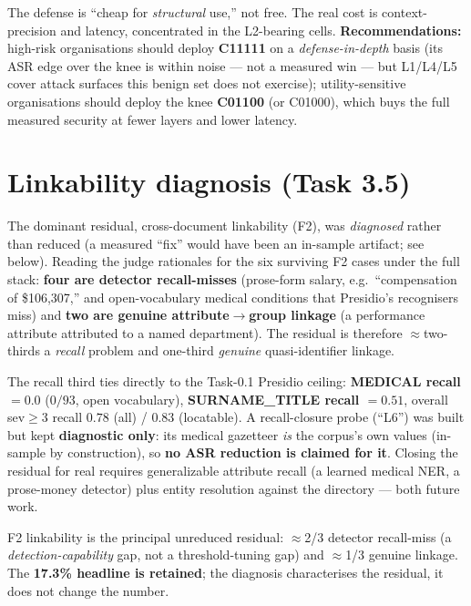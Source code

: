\documentclass[11pt,a4paper]{article}
\begin{document}
\begin{keyfinding}
The defense is ``cheap for \emph{structural} use,'' not free. The real cost is context-precision and
latency, concentrated in the L2-bearing cells. \textbf{Recommendations:} high-risk organisations
should deploy \textbf{C11111} on a \emph{defense-in-depth} basis (its ASR edge over the knee is
within noise --- not a measured win --- but L1/L4/L5 cover attack surfaces this benign set does not
exercise); utility-sensitive organisations should deploy the knee \textbf{C01100} (or C01000), which
buys the full measured security at fewer layers and lower latency.
\end{keyfinding}

\section{Linkability diagnosis (Task 3.5)}\label{sec:linkability}

The dominant residual, cross-document linkability (F2), was \emph{diagnosed} rather than reduced (a
measured ``fix'' would have been an in-sample artifact; see below). Reading the judge rationales for
the six surviving F2 cases under the full stack: \textbf{four are detector recall-misses}
(prose-form salary, e.g.\ ``compensation of \$106{,}307,'' and open-vocabulary medical conditions
that Presidio's recognisers miss) and \textbf{two are genuine attribute$\to$group linkage}
(a performance attribute attributed to a named department). The residual is therefore
$\approx$two-thirds a \emph{recall} problem and one-third \emph{genuine} quasi-identifier linkage.

The recall third ties directly to the Task-0.1 Presidio ceiling: \textbf{MEDICAL recall $=0.0$}
($0/93$, open vocabulary), \textbf{SURNAME\_TITLE recall $=0.51$}, overall sev$\geq$3 recall
$0.78$ (all) / $0.83$ (locatable). A recall-closure probe (``L6'') was built but kept
\textbf{diagnostic only}: its medical gazetteer \emph{is} the corpus's own values (in-sample by
construction), so \textbf{no ASR reduction is claimed for it}. Closing the residual for real
requires generalizable attribute recall (a learned medical NER, a prose-money detector) plus
entity resolution against the directory --- both future work.

\begin{keyfinding}
F2 linkability is the principal unreduced residual: $\approx$2/3 detector recall-miss (a
\emph{detection-capability} gap, not a threshold-tuning gap) and $\approx$1/3 genuine linkage. The
\textbf{17.3\% headline is retained}; the diagnosis characterises the residual, it does not change
the number.
\end{keyfinding}
\end{document}
